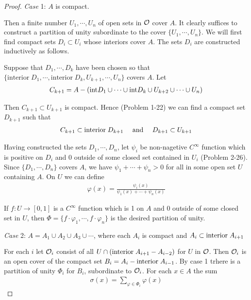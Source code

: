 \begin{proof}
    \textit{Case} 1: $A$ is compact.\par 
    Then a finite number $U_1, \cdots, U_n$ of open sets in $\mathcal{O}$ cover $A$.
    It clearly suffices to construct a partition of unity subordinate
    to the cover $\{U_1, \cdots, U_n\}$. We will first find compact sets $D_i \subset U_i$ 
    whose interiors cover $A$. The sets $D_i$ are constructed inductively as follows.
    
    Suppose that $D_1, \cdots ,D_k$ have been chosen so that \\
    $\{\text{interior}\; D_1, \cdots, \text{interior}\;D_k, U_{k+1}, \cdots, U_n\}$ covers $A$. Let 
    \begin{align*}
        C_{k+1} = 
        A - (\mathrm{int} D_1\cup \cdots \cup \mathrm{int} D_k \cup U_{k+2} \cup \cdots \cup U_n)
    \end{align*}
    
    Then $C_{k+1}\subset U_{k+1}$ is compact. Hence (Problem 1-22) we can find a compact set
    $D_{k+1}$ such that 
    \begin{align*}
        C_{k+1} \subset \mathrm{interior}\; D_{k+1} && \text{ and } && D_{k+1} \subset U_{k+1}
    \end{align*} 

    Having constructed the sets $D_1, \cdots, D_n$, let $\psi_i$  be non-nagetive $C^\infty$
    function which is positive on $D_i$ and 0 outside of some closed set contained in $U_i$ (Problem 
    2-26). Since $\{D_1, \cdots, D_n\}$ covers $A$, we have $\psi_1+\cdots +\psi_n>0$ for all 
    in some open set $U$ containing $A$. On $U$ we can define 
    \begin{align*}
        \varphi(x) = \frac{\psi_i(x)}{\psi_1(x)+\cdots +\psi_n(x)}
    \end{align*}

    If $f\colon{}U\to [0,1]$ is a $C^\infty$ function which is 1 on $A$ and 0 outside of some closed set
    in $U$, then $\Phi = \{f\cdot \varphi_1, \cdots, f\cdot\varphi_n\}$ is the desired partition of 
    unity.

    \textit{Case} 2: $A = A_1\cup A_2\cup A_3\cup \cdots $, where each $A_i$ is compact 
    and $A_i\subset \mathrm{interior}\; A_{i+1}$\par 
    For each $i$ let $\mathcal{O}_i$ consist of all $U\cap (\mathrm{interior}\;A_{i+1}-A_{i-2})$ for $U$ in 
    $\mathcal{O}$. Then $\mathcal{O}_i$ is an open cover of the compact set $B_i=A_i - \mathrm{interior}\; A_{i-1}$. 
    By case 1 trhere is a partition of unity $\Phi_i$ for $B_i$, subordinate to $\mathcal{O}_i$. For 
    each $x\in A$ the sum 
    \begin{align*}
        \sigma(x) = \sum_{\varphi\in \Phi_i} \varphi(x)
    \end{align*} 


\end{proof}
